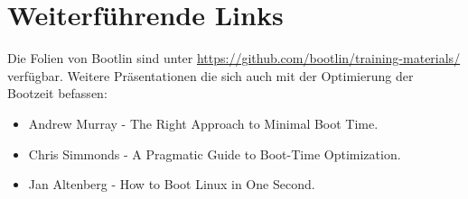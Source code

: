 
\section{Weiterführende Links}
Die Folien von Bootlin sind unter \url{https://github.com/bootlin/training-materials/} verfügbar. Weitere Präsentationen die sich auch mit der Optimierung der Bootzeit befassen:
\begin{itemize}
	\item  Andrew Murray - The Right Approach to Minimal Boot Time. \cite{andrewMurrayOpt}
	\item Chris Simmonds - A Pragmatic Guide to Boot-Time Optimization. \cite{chris-simmonds-boot-time-elce-2017_0}
	\item Jan Altenberg - How to Boot Linux in One Second. \cite{janAltenbergOpt}
\end{itemize}
